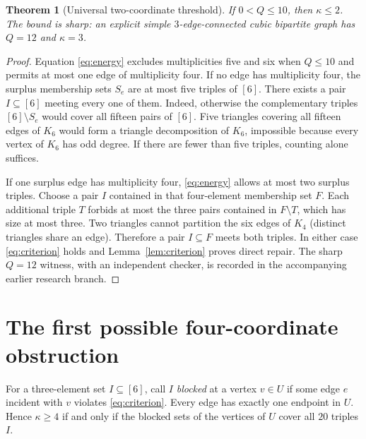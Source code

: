\documentclass[11pt]{article}
\newtheorem{theorem}{Theorem}
\newcommand{\kk}{\kappa}
\begin{document}
\begin{theorem}[Universal two-coordinate threshold]\label{thm:pair}
If $0<Q\le10$, then $\kk\le2$. The bound is sharp: an explicit simple $3$-edge-connected cubic bipartite graph has $Q=12$ and $\kk=3$.
\end{theorem}
\begin{proof}
Equation \eqref{eq:energy} excludes multiplicities five and six when $Q\le10$ and permits at most one edge of multiplicity four. If no edge has multiplicity four, the surplus membership sets $S_e$ are at most five triples of $[6]$. There exists a pair $I\subseteq[6]$ meeting every one of them. Indeed, otherwise the complementary triples $[6]\setminus S_e$ would cover all fifteen pairs of $[6]$. Five triangles covering all fifteen edges of $K_6$ would form a triangle decomposition of $K_6$, impossible because every vertex of $K_6$ has odd degree. If there are fewer than five triples, counting alone suffices.

If one surplus edge has multiplicity four, \eqref{eq:energy} allows at most two surplus triples. Choose a pair $I$ contained in that four-element membership set $F$. Each additional triple $T$ forbids at most the three pairs contained in $F\setminus T$, which has size at most three. Two triangles cannot partition the six edges of $K_4$ (distinct triangles share an edge). Therefore a pair $I\subseteq F$ meets both triples. In either case \eqref{eq:criterion} holds and Lemma~\ref{lem:criterion} proves direct repair. The sharp $Q=12$ witness, with an independent checker, is recorded in the accompanying earlier research branch.
\end{proof}

\section{The first possible four-coordinate obstruction}
For a three-element set $I\subseteq[6]$, call $I$ \emph{blocked} at a vertex $v\in U$ if some edge $e$ incident with $v$ violates \eqref{eq:criterion}. Every edge has exactly one endpoint in $U$. Hence $\kk\ge4$ if and only if the blocked sets of the vertices of $U$ cover all $20$ triples $I$.
\end{document}
